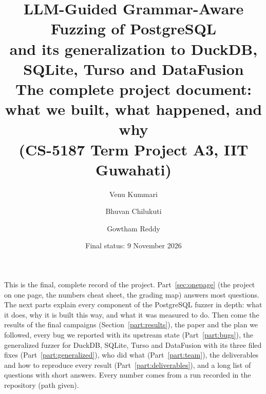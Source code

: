 \documentclass[11pt,a4paper]{article}
\title{\textbf{LLM-Guided Grammar-Aware Fuzzing of PostgreSQL}\\[4pt]
\large and its generalization to DuckDB, SQLite, Turso and DataFusion\\[6pt]
\normalsize The complete project document: what we built, what happened, and why\\
(CS-5187 Term Project A3, IIT Guwahati)}
\author{Venu Kummari \and Bhuvan Chilukuti \and Gowtham Reddy}
\date{Final status: 9 November 2026}
\newcommand{\pg}{PostgreSQL\xspace}
\begin{document}
\maketitle
\thispagestyle{empty}

\begin{keybox}
This is the final, complete record of the project. Part~\ref{sec:onepage} (the
project on one page, the numbers cheat sheet, the grading map) answers most
questions. The next parts explain every component of the \pg fuzzer in depth:
what it does, why it is built this way, and what it was measured to do. Then come
the results of the final campaigns (Section~\ref{part:results}), the paper and the
plan we followed, every bug we reported with its upstream state
(Part~\ref{part:bugs}), the generalized fuzzer for DuckDB, SQLite, Turso and
DataFusion with its three filed fixes (Part~\ref{part:generalized}), who did
what (Part~\ref{part:team}), the deliverables and how to reproduce every result
(Part~\ref{part:deliverables}), and a long list of questions with short answers.
Every number comes from a run recorded in the repository (path given).
\end{keybox}

\tableofcontents
\clearpage

















\end{document}
